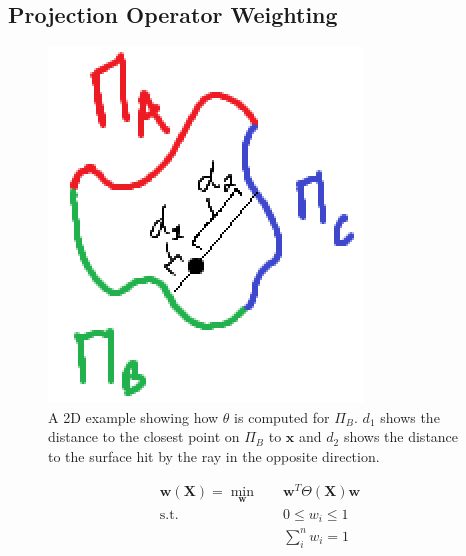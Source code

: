 \documentclass[sigconf]{acmart}
\begin{document}
\subsection{Projection Operator Weighting}
\begin{figure}[h]
  \centering
  \includegraphics[width=\linewidth]{figures/distance_weighting}
  \caption{A 2D example showing how $\theta$ is computed for $\Pi_B$. $d_1$ shows the distance to the closest point on $\Pi_B$ to $\mathbf{x}$ and $d_2$ shows the distance to the surface hit by the ray in the opposite direction.}
\end{figure}

\begin{equation}
\begin{aligned}
\mathbf{w}(\mathbf{X}) = \min_{\mathbf{w}} \quad & \mathbf{w}^T \Theta(\mathbf{X}) \mathbf{w}    \\
\textrm{s.t.} \quad & 0 \leq w_i \leq 1                     \\
                    &   \sum_i^n w_i = 1                      \\
\end{aligned}
\end{equation}
\end{document}
